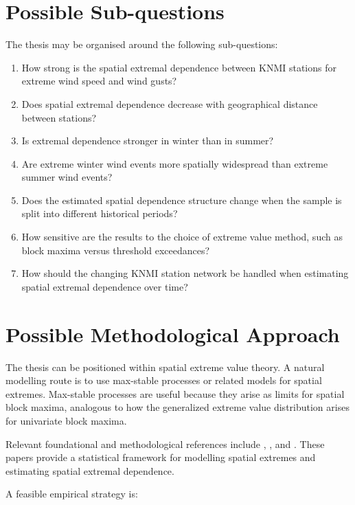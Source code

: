 \documentclass[11pt,a4paper]{article}
\begin{document}
\section{Possible Sub-questions}

The thesis may be organised around the following sub-questions:

\begin{enumerate}[label=\arabic*.]
    \item How strong is the spatial extremal dependence between KNMI stations for extreme wind speed and wind gusts?
    \item Does spatial extremal dependence decrease with geographical distance between stations?
    \item Is extremal dependence stronger in winter than in summer?
    \item Are extreme winter wind events more spatially widespread than extreme summer wind events?
    \item Does the estimated spatial dependence structure change when the sample is split into different historical periods?
    \item How sensitive are the results to the choice of extreme value method, such as block maxima versus threshold exceedances?
    \item How should the changing KNMI station network be handled when estimating spatial extremal dependence over time?
\end{enumerate}

\section{Possible Methodological Approach}

The thesis can be positioned within spatial extreme value theory. A natural modelling route is to use max-stable processes or related models for spatial extremes. Max-stable processes are useful because they arise as limits for spatial block maxima, analogous to how the generalized extreme value distribution arises for univariate block maxima.

Relevant foundational and methodological references include \citet{smith1990}, \citet{padoan2010}, and \citet{davison2012}. These papers provide a statistical framework for modelling spatial extremes and estimating spatial extremal dependence.

A feasible empirical strategy is:
\end{document}
